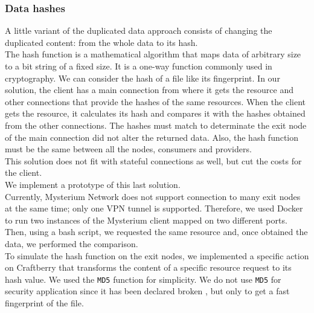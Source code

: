 \documentclass[12pt]{article}
\begin{document}
		\subsubsection{Data hashes}
		A little variant of the duplicated data approach consists of changing the duplicated content: from the whole data to its hash.\\
		The hash function is a mathematical algorithm that maps data of arbitrary size to a bit string of a fixed size. It is a one-way function commonly used in cryptography. We can consider the hash of a file like its fingerprint. In our solution, the client has a main connection from where it gets the resource and other connections that provide the hashes of the same resources. When the client gets the resource, it calculates its hash and compares it with the hashes obtained from the other connections. The hashes must match to determinate the exit node of the main connection did not alter the returned data. Also, the hash function must be the same between all the nodes, consumers and providers.\\
		\bigbreak
		This solution does not fit with stateful connections as well, but cut the costs for the client.\\
		\bigbreak
		We implement a prototype of this last solution.\\
		Currently, Mysterium Network does not support connection to many exit nodes at the same time; only one VPN tunnel is supported. Therefore, we used Docker to run two instances of the Mysterium client mapped on two different ports. Then, using a bash script, we requested the same resource and, once obtained the data, we performed the comparison.\\
		To simulate the hash function on the exit nodes, we implemented a specific action on Craftberry that transforms the content of a specific resource request to its hash value. We used the \lstinline{MD5} function for simplicity. We do not use \lstinline{MD5} for security application since it has been declared broken \cite{MD5hash}, but only to get a fast fingerprint of the file.\\
	
\end{document}
